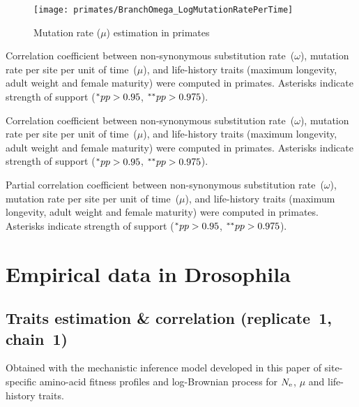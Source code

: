 \begin{figure}[H]
    \centering
    \texttt{[image: primates/BranchOmega\_LogMutationRatePerTime]}
    \caption[$\mu$ estimation in primates]{Mutation rate ($\mu$) estimation in primates}
\end{figure}

\begin{table}[H]
    
    \caption[Correlation coefficient matrix in primates ($\omega$)]{
    Correlation coefficient between non-synonymous substitution rate~($\omega$), mutation rate per site per unit of time~($\mu$), and life-history traits (maximum longevity, adult weight and female maturity) were computed in primates.
    Asterisks indicate strength of support ($\smash{^{*}} pp > 0.95$, $\smash{^{**}} pp > 0.975$).}
\end{table}

\begin{table}[H]
    
    \caption[Covariance matrix in primates ($\omega$)]{
    Correlation coefficient between non-synonymous substitution rate~($\omega$), mutation rate per site per unit of time~($\mu$), and life-history traits (maximum longevity, adult weight and female maturity) were computed in primates.
    Asterisks indicate strength of support ($\smash{^{*}} pp > 0.95$, $\smash{^{**}} pp > 0.975$).}
\end{table}

\begin{table}[H]
    
    \caption[Partial correlation coefficient matrix in primates ($\omega$)]{
    Partial correlation coefficient between non-synonymous substitution rate~($\omega$), mutation rate per site per unit of time~($\mu$), and life-history traits (maximum longevity, adult weight and female maturity) were computed in primates.
    Asterisks indicate strength of support ($\smash{^{*}} pp > 0.95$, $\smash{^{**}} pp > 0.975$).}
\end{table}


\section{Empirical data in Drosophila}
\label{sec:empirical-data-in-Drosophila}

\subsection{Traits estimation \& correlation (replicate~1, chain~1)}
Obtained with the mechanistic inference model developed in this paper of site-specific amino-acid fitness profiles and log-Brownian process for $N_{\text{e}}$, $\mu$ and life-history traits.

